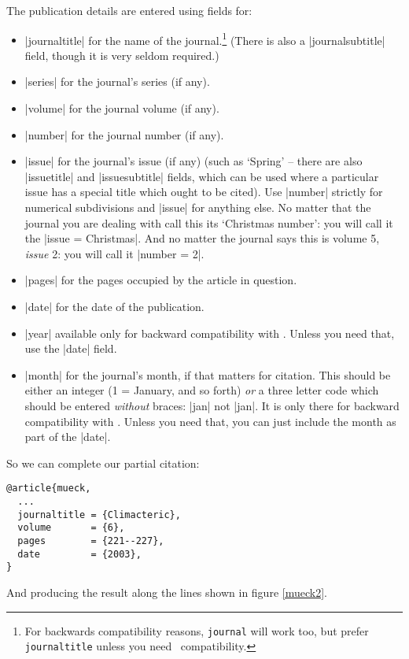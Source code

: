 The publication details are entered using fields for:
\begin{itemize}
\item |journaltitle| for the name of the journal.\footnote{For
    backwards compatibility reasons, \texttt{journal} will work too,
    but prefer \texttt{journaltitle} unless you need \bibtex\
    compatibility.} (There is also a |journalsubtitle| field, though
  it is very seldom required.)
\item |series| for the journal's series (if any).
\item |volume| for the journal volume (if any).
\item |number| for the journal number (if any).
\item |issue| for the journal's issue (if any) (such as `Spring' --
  there are also |issuetitle| and |issuesubtitle| fields, which can be
  used where a particular issue has a special title which ought to be
  cited). Use |number| strictly for numerical subdivisions and |issue|
  for anything else. No matter that the journal you are dealing with
  call this its `Christmas number': you will call it the |issue = {Christmas}|.
  And no matter the journal says this is volume 5, \emph{issue}
  2: you will call it |number = 2|.
\item |pages| for the pages occupied by the article in question.
\item |date| for the date of the publication.
\item |year| available only for backward compatibility with
  \bibtex. Unless you need that, use the |date| field.
\item |month| for the journal's month, if that matters for
  citation. This should be either an integer (1 = January, and so
  forth) \emph{or} a three letter code which should be entered
  \emph{without} braces: |jan| not |{jan}|. It is only there for
  backward compatibility with \bibtex. Unless you need that, you can just include the month as part of the |date|.

\end{itemize}

So we can complete our partial citation:
\begin{Verbatim}
@article{mueck,
  ...
  journaltitle = {Climacteric},
  volume       = {6},
  pages        = {221--227},
  date         = {2003},
}
\end{Verbatim}

And producing the result along the lines shown in figure \ref{mueck2}.

